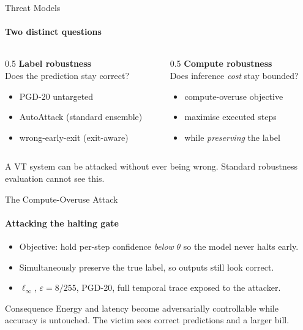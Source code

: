 \documentclass[aspectratio=169,11pt]{beamer}
\newcommand{\ATK}[1]{\textcolor{catk}{#1}}
\begin{document}
\begin{frame}{Threat Models}\framesubtitle{Two distinct questions}
\begin{columns}[T]
\begin{column}{0.5\textwidth}
\textbf{Label robustness}
\vspace{3mm}\\ Does the prediction stay correct?
\begin{itemize}\small
  \item PGD-20 untargeted
  \item AutoAttack (standard ensemble)
  \item wrong-early-exit (exit-aware)
\end{itemize}
\end{column}
\begin{column}{0.5\textwidth}
\textbf{\ATK{Compute robustness}}
\vspace{3mm}\\ Does inference \emph{cost} stay bounded?
\begin{itemize}\small
  \item compute-overuse objective
  \item maximise executed steps
  \item while \emph{preserving} the label
\end{itemize}
\end{column}
\end{columns}
\vspace{0.5em}
\begin{alertblock}{}
\small A VT system can be attacked without ever being wrong. Standard robustness
evaluation cannot see this.
\end{alertblock}
\end{frame}

\begin{frame}{The Compute-Overuse Attack}\framesubtitle{Attacking the halting gate}
\begin{itemize}
  \item Objective: hold per-step confidence \emph{below} $\theta$ so the model never halts early.
  \item Simultaneously preserve the true label, so outputs still look correct.
  \item $\ell_\infty$, $\varepsilon = 8/255$, PGD-20, full temporal trace exposed to the attacker.
\end{itemize}
\begin{block}{Consequence}
Energy and latency become adversarially controllable while accuracy is untouched. The
victim sees correct predictions and a larger bill.
\end{block}
\end{frame}
\end{document}
